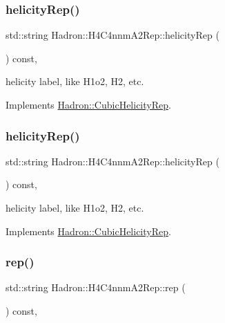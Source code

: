 \subsubsection{\texorpdfstring{helicityRep()}{helicityRep()}\hspace{0.1cm}{\footnotesize\ttfamily [2/3]}}
{\footnotesize\ttfamily std\+::string Hadron\+::\+H4\+C4nnm\+A2\+Rep\+::helicity\+Rep (\begin{DoxyParamCaption}{ }\end{DoxyParamCaption}) const\hspace{0.3cm}{\ttfamily [inline]}, {\ttfamily [virtual]}}

helicity label, like H1o2, H2, etc. 

Implements \mbox{\hyperlink{structHadron_1_1CubicHelicityRep_af1096946b7470edf0a55451cc662f231}{Hadron\+::\+Cubic\+Helicity\+Rep}}.

\mbox{\label{structHadron_1_1H4C4nnmA2Rep_a22ac4fc575c83f59d3df9d247a6523a8}} 
\subsubsection{\texorpdfstring{helicityRep()}{helicityRep()}\hspace{0.1cm}{\footnotesize\ttfamily [3/3]}}
{\footnotesize\ttfamily std\+::string Hadron\+::\+H4\+C4nnm\+A2\+Rep\+::helicity\+Rep (\begin{DoxyParamCaption}{ }\end{DoxyParamCaption}) const\hspace{0.3cm}{\ttfamily [inline]}, {\ttfamily [virtual]}}

helicity label, like H1o2, H2, etc. 

Implements \mbox{\hyperlink{structHadron_1_1CubicHelicityRep_af1096946b7470edf0a55451cc662f231}{Hadron\+::\+Cubic\+Helicity\+Rep}}.

\mbox{\label{structHadron_1_1H4C4nnmA2Rep_a8a7be6ed1396d06723b3d7891b6ab5a8}} 
\subsubsection{\texorpdfstring{rep()}{rep()}\hspace{0.1cm}{\footnotesize\ttfamily [1/5]}}
{\footnotesize\ttfamily std\+::string Hadron\+::\+H4\+C4nnm\+A2\+Rep\+::rep (\begin{DoxyParamCaption}{ }\end{DoxyParamCaption}) const\hspace{0.3cm}{\ttfamily [inline]}, {\ttfamily [virtual]}}



